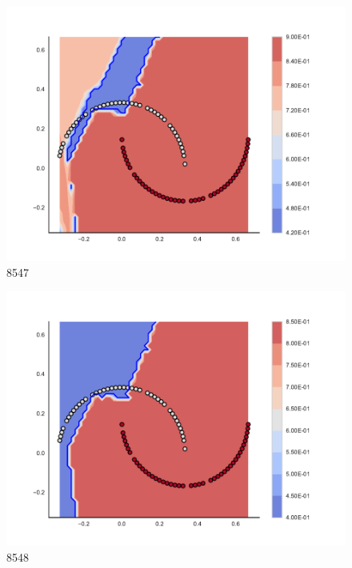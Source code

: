 \begin{subfigure}[b]{0.09\textwidth}
    \includegraphics[clip, trim=2.35cm 1.75cm 4.5cm 0cm,width=\textwidth]{img/convergence/8547.pdf}
    \caption{8547}
    \label{fig:convergence_8547}
\end{subfigure}
%
\begin{subfigure}[b]{0.09\textwidth}
    \includegraphics[clip, trim=2.35cm 1.75cm 4.5cm 0cm,width=\textwidth]{img/convergence/8548.pdf}
    \caption{8548}
    \label{fig:convergence_8548}
\end{subfigure}
%
